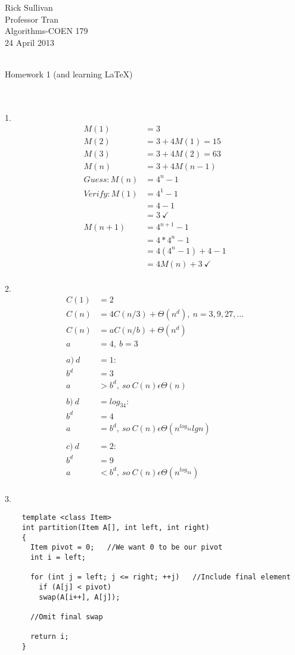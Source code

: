 \documentclass{article}
\begin{document}
\noindent Rick Sullivan \\
Professor Tran 		\\
Algorithms-COEN 179 	\\
24 April 2013 		\\
			\\
\centerline{Homework 1 (and learning \LaTeX)} \\
			\\
1. 	\begin{align*}
	M(1) &= 3		\\
	M(2) &= 3 + 4M(1) = 15	\\
	M(3) &= 3 + 4M(2) = 63	\\
	M(n) &= 3 + 4M(n-1)	\\
	Guess: M(n) &= 4^{n}-1	\\
	Verify: M(1) &= 4^{1}-1	\\
	&= 4 - 1		\\
	&= 3\ \checkmark	\\
	M(n+1) &= 4^{n+1}-1	\\
	&= 4*4^{n}-1		\\
	&= 4(4^{n}-1)+4-1	\\
	&= 4M(n)+3\ \checkmark	\\
	\end{align*}

2.	\begin{align*}
	C(1) &= 2					\\
	C(n) &= 4C(n/3)+\Theta(n^d),\ n=3,9,27,...	\\	
	C(n) &= aC(n/b)+\Theta(n^d)			\\
	a &= 4,\ b = 3					\\
							\\
	a)\ d &= 1:					\\
	b^d &= 3					\\
	a &> b^d,\ so\ C(n) \epsilon \Theta(n)		\\
							\\
	b)\ d &= log_34:				\\
	b^d &= 4					\\
	a &= b^d,\ so\ C(n) \epsilon \Theta(n^{log_34}lgn)	\\
							\\
	c)\ d &= 2:					\\
	b^d &= 9					\\
	a &< b^d,\ so\ C(n) \epsilon \Theta(n^{log_34})		\\
	\end{align*}

\pagebreak

3.	\begin{lstlisting}
	template <class Item>
	int partition(Item A[], int left, int right)
	{
	  Item pivot = 0;	//We want 0 to be our pivot
	  int i = left;

	  for (int j = left; j <= right; ++j)	//Include final element
	    if (A[j] < pivot)
		swap(A[i++], A[j]);

	  //Omit final swap

	  return i;
	}
	\end{lstlisting}
\end{document}

